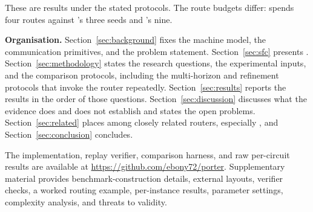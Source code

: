 These are results under the stated protocols.
The route budgets differ: \PORTER{} spends four routes against
\TeleSABRE{}'s three seeds and \dSABRE{}'s nine. 

\textbf{Organisation.} Section~\ref{sec:background} fixes the machine model,
the communication primitives, and the problem statement.
Section~\ref{sec:sfc} presents \PORTER{}. Section~\ref{sec:methodology} states the
research questions, the experimental inputs, and the comparison protocols,
including the multi-horizon and refinement protocols that invoke the router
repeatedly. Section~\ref{sec:results} reports the results in the order of
those questions. Section~\ref{sec:discussion} discusses what the evidence
does and does not establish and states the open problems.
Section~\ref{sec:related} places \PORTER{} among closely related routers,
especially \dSABRE{}, and Section~\ref{sec:conclusion} concludes.

The implementation, replay verifier, comparison harness, and raw
per-circuit results are available at
\url{https://github.com/ebony72/porter}. Supplementary material provides benchmark-construction details, external
layouts, verifier checks, a worked routing example, per-instance results,
parameter settings, complexity analysis, and threats to validity.
